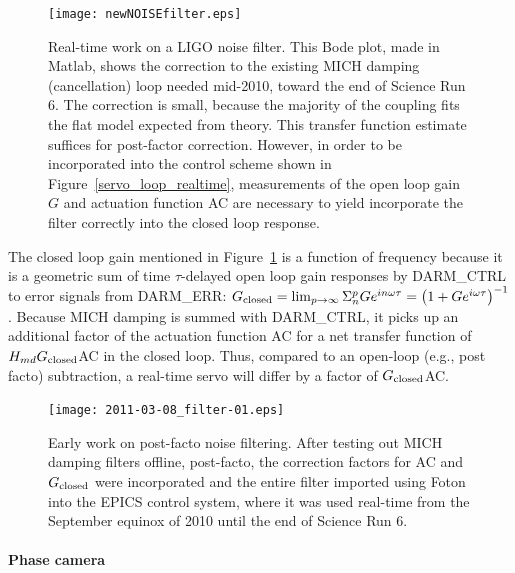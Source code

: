 	\begin{figure}
	\begin{center}
	\texttt{[image: newNOISEfilter.eps]}
	\caption{Real-time work on a LIGO noise filter. This Bode plot, made in Matlab, shows the correction to the existing MICH damping (cancellation) loop needed mid-2010, toward the end of Science Run 6. The correction is small, because the majority of the coupling fits the flat model expected from theory. This transfer function estimate suffices for post-factor correction. However, in order to be incorporated into the control scheme shown in Figure~\ref{servo_loop_realtime}, measurements of the open loop gain $G$ and actuation function AC are necessary to yield incorporate the filter correctly into the closed loop response.} 
	\label{newNOISEfilter}
	\end{center}
	\end{figure}

The closed loop gain mentioned in Figure~\ref{newNOISEfilter} is a function of frequency because it is a geometric sum of time $\tau$-delayed open loop gain responses by DARM\_CTRL to error signals from DARM\_ERR: $G_\textup{closed} = \lim_{p\rightarrow\infty} \Sigma_n^p G e^{i n \omega \tau} = \left(1 + G e^{i \omega \tau} \right)^{-1}$. 
Because MICH damping is summed with DARM\_CTRL, it picks up an additional factor of the actuation function AC for a net transfer function of $H_{md} G_\textup{closed}$AC in the closed loop. 
Thus, compared to an open-loop (e.g., post facto) subtraction, a real-time servo will differ by a factor of $G_\textup{closed}$AC. 

	\begin{figure}
	\begin{center}
	\texttt{[image: 2011-03-08\_filter-01.eps]}
	\caption{Early work on post-facto noise filtering. After testing out MICH damping filters offline, post-facto, the correction factors for AC and $G_\textup{closed}$ were incorporated and the entire filter imported using Foton into the EPICS control system, where it was used real-time from the September equinox of 2010 until the end of Science Run 6.}
	\label{filter_early}
	\end{center}
	\end{figure}

                \paragraph{Phase camera}
                \label{phase_camera}

